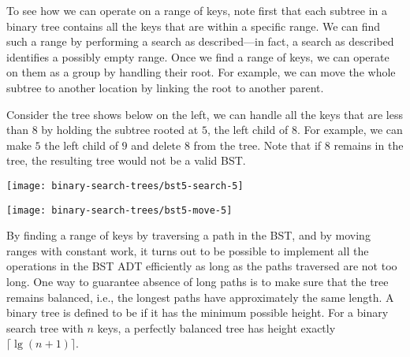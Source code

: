 To see how we can operate on a range of keys, note first that each
subtree in a binary tree contains all the keys that are within a
specific range. 
%
We can find such a range by performing a search as
described---in fact, a search as described identifies a possibly empty
range. Once we find a range of keys, we can operate on them as a group
by handling their root.
%
For example, we can move the whole subtree to another location by
linking the root to another parent.

\begin{example}
Consider the tree shows below on the left, we can handle all the keys
that are less than $8$ by holding the subtree rooted at $5$, the left
child of $8$.  For example, we can make $5$ the left child of $9$ and
delete $8$ from the tree. Note that if $8$ remains in the tree, the
resulting tree would not be a valid BST.

\begin{center}
\parbox[t]{3cm}
{
\vspace*{0cm}
\texttt{[image: binary-search-trees/bst5-search-5]}
}
\hspace*{3cm}
\parbox[t]{3cm}
{
\vspace*{0cm}
\texttt{[image: binary-search-trees/bst5-move-5]}
}
\end{center}
\end{example}




By finding a range of keys by traversing a path in the BST, and by
moving ranges with constant work, it turns out to be possible to
implement all the operations in the BST ADT efficiently as long as the
paths traversed are not too long.
%
One way to guarantee absence of long paths is to make sure that the
tree remains balanced, i.e., the longest paths have approximately
the same length.
%
A binary tree is defined to be  if it has the
minimum possible height.  
%
For a binary search tree with $n$ keys, a perfectly balanced tree has
height exactly $\lceil \lg (n + 1) \rceil$.

